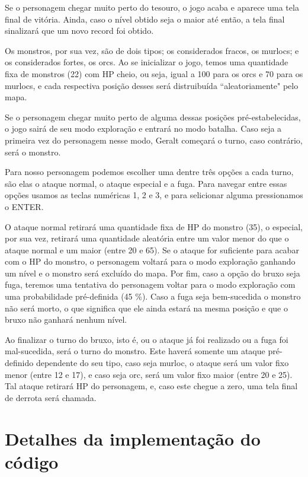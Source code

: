 \documentclass[a4paper, 12pt]{article}
\begin{document}
  Se o personagem chegar muito perto do tesouro, o jogo acaba e aparece uma tela final de vitória. Ainda, caso o nível obtido seja o maior até então, a tela final sinalizará que um novo record foi obtido.
  
  Os monstros, por sua vez, são de dois tipos; os considerados fracos, os murlocs; e os considerados fortes, os orcs. Ao se inicializar o jogo, temos uma quantidade fixa de monstros (22) com HP cheio, ou seja, igual a 100 para os orcs e 70 para os murlocs, e cada respectiva posição desses será distruibuída ``aleatoriamente" pelo mapa.
  
   Se o personagem chegar muito perto de alguma dessas posições pré-estabelecidas, o jogo sairá de seu modo exploração e entrará no modo batalha. Caso seja a primeira vez do personagem nesse modo, Geralt começará o turno, caso contrário, será o monstro. 
   
   Para nosso personagem podemos escolher uma dentre três opções a cada turno, são elas o ataque normal, o ataque especial e a fuga. Para navegar entre essas opções usamos as teclas numéricas 1, 2 e 3, e para selicionar alguma pressionamos o ENTER.  
   
   O ataque normal retirará uma quantidade fixa de HP do monstro (35), o especial, por sua vez, retirará uma quantidade aleatória entre um valor menor do que o ataque normal e um maior (entre 20 e 65). Se o ataque for suficiente para acabar com o HP do monstro, o personagem voltará para o modo exploração ganhando um nível e o monstro será excluído do mapa. Por fim, caso a opção do bruxo seja fuga, teremos uma tentativa do personagem voltar para o modo exploração com uma probabilidade pré-definida (45 \%). Caso a fuga seja bem-sucedida o monstro não será morto, o que significa que ele ainda estará na mesma posição e que o bruxo não ganhará nenhum nível.
   
   Ao finalizar o turno do bruxo, isto é, ou o ataque já foi realizado ou a fuga foi mal-sucedida, será o turno do monstro. Este haverá somente um ataque pré-definido dependente do seu tipo, caso seja murloc, o ataque será um valor fixo menor (entre 12 e 17), e caso seja orc, será um valor fixo maior (entre 20 e 25). Tal ataque retirará HP do personagem, e, caso este chegue a zero, uma tela final de derrota será chamada.
   
\section{Detalhes da implementação do código}
\end{document}
